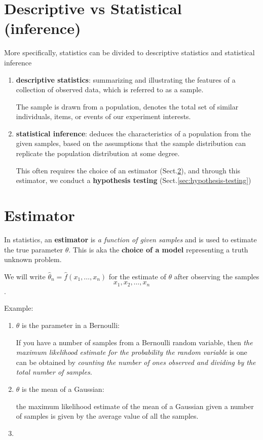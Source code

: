 \section{Descriptive vs Statistical (inference)}
\label{sec:statistical-inference}
\label{sec:descriptive-inference}

More specifically, statistics can be divided to descriptive statistics and statistical inference
\begin{enumerate}
  \item {\bf descriptive statistics}:
  summarizing and illustrating the features of a collection of observed data, which is referred to as a sample.
  
  The sample is drawn from a population, denotes the total set of similar individuals, items, or events of our experiment interests. 
  
  \item {\bf statistical inference}:
   deduces the characteristics of a population from the given samples, based on
   the assumptions that the sample distribution can replicate the population
   distribution at some degree.
   
   This often requires the choice of an estimator (Sect.\ref{sec:estimator}), and through this estimator, we conduct a {\bf hypothesis testing} (Sect.\ref{sec:hypothesis-testing})
   
\end{enumerate}

\section{Estimator}
\label{sec:estimator}

In statistics, an {\bf estimator} is {\it a function of given samples} and is
used to estimate the true parameter $\theta$. This is aka the {\bf choice of a
model} representing a truth unknown problem.

We will write $\hat{\theta}_n = \hat{f}(x_1, \ldots, x_n)$ for the estimate of
$\theta$ after observing the samples
\begin{equation}
{ x_1, x_2, \ldots, x_n }
\end{equation}.

Example:
\begin{enumerate}
  \item $\theta$ is the parameter in a Bernoulli: 
  
  If you have a number of samples from a Bernoulli random variable, then {\it the
  maximum likelihood estimate for the probability the random variable} is one can
  be obtained by {\it counting the number of ones observed and dividing by the total
  number of samples.}
  
  \item $\theta$ is the mean of a Gaussian:
  
  the maximum likelihood estimate of the mean of a Gaussian given a number of
  samples is given by the average value of all the samples.
  
  \item 
\end{enumerate}

